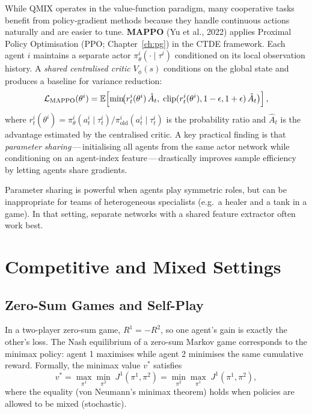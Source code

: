 While QMIX operates in the value-function paradigm, many cooperative
tasks benefit from policy-gradient methods because they handle
continuous actions naturally and are easier to tune. \textbf{MAPPO}
 (Yu et al., 2022) applies Proximal Policy
Optimisation (PPO; Chapter~\ref{ch:pg}) in the CTDE framework.
Each agent $i$ maintains a separate actor $\pi^i_\theta(\cdot \mid
\tau^i)$ conditioned on its local observation history. A \emph{shared
centralised critic} $V_\phi(s)$ conditions on the global state and
produces a baseline for variance reduction:
\begin{equation}
\label{eq:mappo-objective}
\mathcal{L}_\mathrm{MAPPO}(\theta^i) =
\operatorname{\mathbb{E}}\!\left[\min\!\bigl(r^i_t(\theta^i)\,\hat{A}_t,\;
  \mathrm{clip}(r^i_t(\theta^i), 1-\epsilon, 1+\epsilon)\,\hat{A}_t
\bigr)\right],
\end{equation}
where $r^i_t(\theta^i) = \pi^i_\theta(a^i_t \mid \tau^i_t) /
\pi^i_{\mathrm{old}}(a^i_t \mid \tau^i_t)$ is the probability ratio
and $\hat{A}_t$ is the advantage estimated by the centralised critic.
A key practical finding is that \emph{parameter sharing}\,---\,initialising all agents from the same actor network
while conditioning on an agent-index feature\,---\,drastically
improves sample efficiency by letting agents share gradients.

\begin{remark}
Parameter sharing is powerful when agents play symmetric roles, but
can be inappropriate for teams of heterogeneous specialists (e.g.\ a
healer and a tank in a game). In that setting, separate networks with
a shared feature extractor often work best.
\end{remark}

\section{Competitive and Mixed Settings}
\label{sec:competitive}

\subsection{Zero-Sum Games and Self-Play}

In a two-player zero-sum game, $R^1 = -R^2$, so one agent's gain is
exactly the other's loss. The Nash equilibrium of a zero-sum Markov
game corresponds to the minimax policy: agent 1 maximises while agent
2 minimises the same cumulative reward. Formally, the minimax value
$v^*$ satisfies
\[
  v^* = \max_{\pi^1} \min_{\pi^2}\; J^1(\pi^1, \pi^2)
       = \min_{\pi^2} \max_{\pi^1}\; J^1(\pi^1, \pi^2),
\]
where the equality (von Neumann's minimax theorem)
holds when policies are allowed to be mixed (stochastic).

